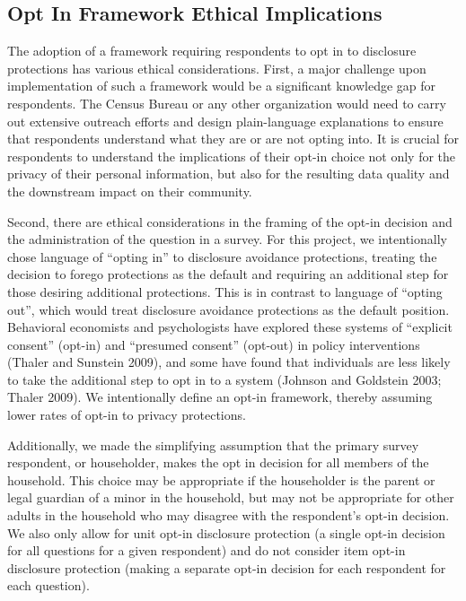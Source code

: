 \documentclass[
]{urban-formatting}
\begin{document}
\subsection{Opt In Framework Ethical Implications}

The adoption of a framework requiring respondents to opt in to
disclosure protections has various ethical considerations. First, a
major challenge upon implementation of such a framework would be a
significant knowledge gap for respondents. The Census Bureau or any
other organization would need to carry out extensive outreach efforts
and design plain-language explanations to ensure that respondents
understand what they are or are not opting into. It is crucial for
respondents to understand the implications of their opt-in choice not
only for the privacy of their personal information, but also for the
resulting data quality and the downstream impact on their community.

Second, there are ethical considerations in the framing of the opt-in
decision and the administration of the question in a survey. For this
project, we intentionally chose language of ``opting in'' to disclosure
avoidance protections, treating the decision to forego protections as
the default and requiring an additional step for those desiring
additional protections. This is in contrast to language of ``opting
out'', which would treat disclosure avoidance protections as the default
position. Behavioral economists and psychologists have explored these
systems of ``explicit consent'' (opt-in) and ``presumed consent''
(opt-out) in policy interventions (Thaler and Sunstein 2009), and some
have found that individuals are less likely to take the additional step
to opt in to a system (Johnson and Goldstein 2003; Thaler 2009). We
intentionally define an opt-in framework, thereby assuming lower rates
of opt-in to privacy protections.

Additionally, we made the simplifying assumption that the primary survey
respondent, or householder, makes the opt in decision for all members of
the household. This choice may be appropriate if the householder is the
parent or legal guardian of a minor in the household, but may not be
appropriate for other adults in the household who may disagree with the
respondent's opt-in decision. We also only allow for unit opt-in
disclosure protection (a single opt-in decision for all questions for a
given respondent) and do not consider item opt-in disclosure protection
(making a separate opt-in decision for each respondent for each
question).
\end{document}
